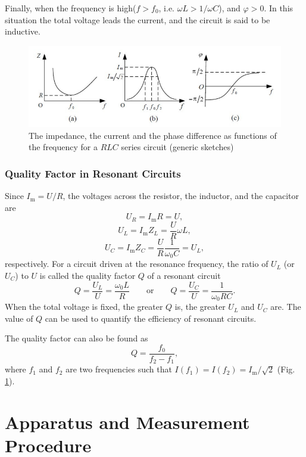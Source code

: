 \documentclass[a4paper]{article}
\begin{document}
Finally, when the frequency is high($f>f_0$, i.e. $\omega L > 1/\omega C$), and $\varphi>0$. In this situation the total voltage leads the current, and the circuit is said to be inductive.

\begin{figure}[!htbp]
	\centering
	\includegraphics[width=15cm]{resonance.png}
	\caption{The impedance, the current and the phase difference as functions of the frequency for a $RLC$ series circuit (generic sketches)}
	\label{fig::resonance}
\end{figure}

\subsubsection{Quality Factor in Resonant Circuits}

Since $I_\text{m} = U/R$, the voltages across the resistor, the inductor, and the capacitor are
$$U_R = I_\text{m}R = U,$$
$$U_L = I_\text{m}Z_L = \frac{U}{R}\omega L,$$
$$U_C = I_\text{m}Z_C = \frac{U}{R}\frac{1}{\omega_0C} = U_L,$$
respectively. For a circuit driven at the resonance frequency, the ratio of $U_L$ (or $U_C$) to $U$ is called the quality factor $Q$ of a resonant circuit
$$Q = \frac{U_L}{U} = \frac{\omega_0 L}{R} \hspace{2em} \text{or} \hspace{2em} Q = \frac{U_C}{U} = \frac{1}{\omega_0 RC}.$$
When the total voltage is fixed, the greater $Q$ is, the greater $U_L$ and $U_C$ are. The value of $Q$ can be used to quantify the efficiency of resonant circuits.

The quality factor can also be found as
$$Q = \frac{f_0}{f_2 - f_1},$$
where $f_1$ and $f_2$ are two frequencies such that $I(f_1) = I(f_2) = I_\text{m}/\sqrt{2}$ (Fig. \ref{fig::resonance}).



\section{Apparatus and Measurement Procedure}
\end{document}
